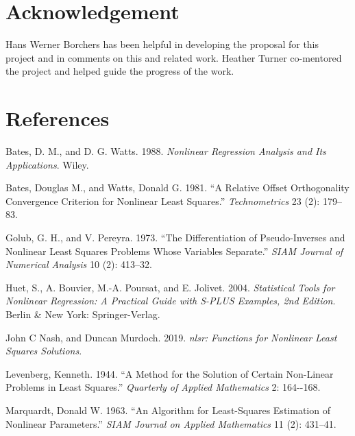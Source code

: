\documentclass[
]{article}
\newlength{\cslhangindent}
\newlength{\cslentryspacingunit} %
\newenvironment{CSLReferences}[2] %
 {%
  \setlength{\parindent}{0pt}
  \ifodd #1
  \let\oldpar\par
  \def\par{\hangindent=\cslhangindent\oldpar}
  \fi
  \setlength{\parskip}{#2\cslentryspacingunit}
 }%
 {}
\begin{document}
\hypertarget{acknowledgement}{%
\section{Acknowledgement}\label{acknowledgement}}

Hans Werner Borchers has been helpful in developing the proposal for
this project and in comments on this and related work. Heather Turner
co-mentored the project and helped guide the progress of the work.

\hypertarget{references}{%
\section*{References}\label{references}}

\hypertarget{refs}{}
\begin{CSLReferences}{1}{0}
\leavevmode{}%
Bates, D. M., and D. G. Watts. 1988. \emph{Nonlinear Regression Analysis
and Its Applications}. Wiley.

\leavevmode{}%
Bates, Douglas M., and Watts, Donald G. 1981. {``A Relative Offset
Orthogonality Convergence Criterion for Nonlinear Least Squares.''}
\emph{Technometrics} 23 (2): 179--83.

\leavevmode{}%
Golub, G. H., and V. Pereyra. 1973. {``The Differentiation of
Pseudo-Inverses and Nonlinear Least Squares Problems Whose Variables
Separate.''} \emph{SIAM Journal of Numerical Analysis} 10 (2): 413--32.

\leavevmode{}%
Huet, S., A. Bouvier, M.-A. Poursat, and E. Jolivet. 2004.
\emph{Statistical Tools for Nonlinear Regression: A Practical Guide with
{S-PLUS} Examples, 2nd Edition}. Berlin \& New York: Springer-Verlag.

\leavevmode{}%
John C Nash, and Duncan Murdoch. 2019. \emph{{nlsr: Functions for
Nonlinear Least Squares Solutions}}.

\leavevmode{}%
Levenberg, Kenneth. 1944. {``A Method for the Solution of Certain
Non-Linear Problems in Least Squares.''} \emph{Quarterly of Applied
Mathematics} 2: 164-\/-168.

\leavevmode{}%
Marquardt, Donald W. 1963. {``{An Algorithm for Least-Squares Estimation
of Nonlinear Parameters}.''} \emph{SIAM Journal on Applied Mathematics}
11 (2): 431--41.


\end{CSLReferences}
\end{document}
